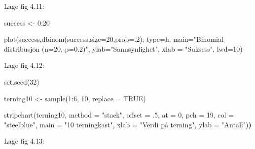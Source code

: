 \documentclass[
]{book}
\newenvironment{Shaded}{\begin{snugshade}}{\end{snugshade}}
\newcommand{\AttributeTok}[1]{\textcolor[rgb]{0.77,0.63,0.00}{#1}}
\newcommand{\ConstantTok}[1]{\textcolor[rgb]{0.00,0.00,0.00}{#1}}
\newcommand{\DecValTok}[1]{\textcolor[rgb]{0.00,0.00,0.81}{#1}}
\newcommand{\ErrorTok}[1]{\textcolor[rgb]{0.64,0.00,0.00}{\textbf{#1}}}
\newcommand{\FunctionTok}[1]{\textcolor[rgb]{0.00,0.00,0.00}{#1}}
\newcommand{\NormalTok}[1]{#1}
\newcommand{\OtherTok}[1]{\textcolor[rgb]{0.56,0.35,0.01}{#1}}
\newcommand{\SpecialCharTok}[1]{\textcolor[rgb]{0.00,0.00,0.00}{#1}}
\newcommand{\StringTok}[1]{\textcolor[rgb]{0.31,0.60,0.02}{#1}}
\begin{document}
Lage fig 4.11:

\begin{Shaded}
\begin{Highlighting}[]
\NormalTok{success }\OtherTok{\textless{}{-}} \DecValTok{0}\SpecialCharTok{:}\DecValTok{20}

\FunctionTok{plot}\NormalTok{(success,}\FunctionTok{dbinom}\NormalTok{(success,}\AttributeTok{size=}\DecValTok{20}\NormalTok{,}\AttributeTok{prob=}\NormalTok{.}\DecValTok{2}\NormalTok{),}
     \AttributeTok{type=}\StringTok{\textquotesingle{}h\textquotesingle{}}\NormalTok{,}
     \AttributeTok{main=}\StringTok{"Binomial distribusjon (n=20, p=0.2)"}\NormalTok{,}
     \AttributeTok{ylab=}\StringTok{"Sannsynlighet"}\NormalTok{,}
     \AttributeTok{xlab =} \StringTok{"Suksess"}\NormalTok{,}
     \AttributeTok{lwd=}\DecValTok{10}\NormalTok{)}
\end{Highlighting}
\end{Shaded}

Lage fig 4.12:

\begin{Shaded}
\begin{Highlighting}[]
\FunctionTok{set.seed}\NormalTok{(}\DecValTok{32}\NormalTok{)}

\NormalTok{terning10 }\OtherTok{\textless{}{-}} \FunctionTok{sample}\NormalTok{(}\DecValTok{1}\SpecialCharTok{:}\DecValTok{6}\NormalTok{, }\DecValTok{10}\NormalTok{, }\AttributeTok{replace =} \ConstantTok{TRUE}\NormalTok{)}

\FunctionTok{stripchart}\NormalTok{(terning10, }\AttributeTok{method =} \StringTok{"stack"}\NormalTok{, }\AttributeTok{offset =}\NormalTok{ .}\DecValTok{5}\NormalTok{, }\AttributeTok{at =} \DecValTok{0}\NormalTok{, }\AttributeTok{pch =} \DecValTok{19}\NormalTok{,}
           \AttributeTok{col =} \StringTok{"steelblue"}\NormalTok{, }\AttributeTok{main =} \StringTok{"10 terningkast"}\NormalTok{, }\AttributeTok{xlab =} \StringTok{"Verdi på terning"}\NormalTok{, }\AttributeTok{ylab =} \StringTok{"Antall"}\NormalTok{)}\ErrorTok{)}
\end{Highlighting}
\end{Shaded}

Lage fig 4.13:
\end{document}
